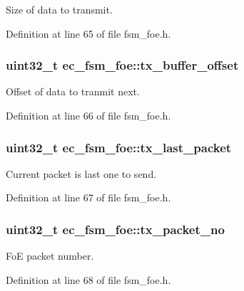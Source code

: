 Size of data to transmit. 



Definition at line 65 of file fsm\-\_\-foe.\-h.

\subsubsection[{tx\-\_\-buffer\-\_\-offset}]{\setlength{\rightskip}{0pt plus 5cm}uint32\-\_\-t ec\-\_\-fsm\-\_\-foe\-::tx\-\_\-buffer\-\_\-offset}\label{structec__fsm__foe_af01ef503eebc97048e1eb67bf5fed201}


Offset of data to tranmit next. 



Definition at line 66 of file fsm\-\_\-foe.\-h.

\subsubsection[{tx\-\_\-last\-\_\-packet}]{\setlength{\rightskip}{0pt plus 5cm}uint32\-\_\-t ec\-\_\-fsm\-\_\-foe\-::tx\-\_\-last\-\_\-packet}\label{structec__fsm__foe_aa4137f668dc4033561be82316a117d8e}


Current packet is last one to send. 



Definition at line 67 of file fsm\-\_\-foe.\-h.

\subsubsection[{tx\-\_\-packet\-\_\-no}]{\setlength{\rightskip}{0pt plus 5cm}uint32\-\_\-t ec\-\_\-fsm\-\_\-foe\-::tx\-\_\-packet\-\_\-no}\label{structec__fsm__foe_a80ee572b78695906bfe1df61cda4bb4a}


Fo\-E packet number. 



Definition at line 68 of file fsm\-\_\-foe.\-h.

